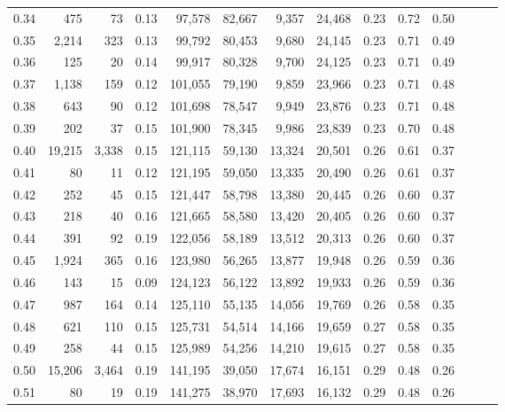 \begin{tabular}{rrrrrrrrrrrrrr}
0.34 &     475 &     73 &  0.13 &   97,578 &   82,667 &   9,357 &  24,468 &  0.23 &  0.72 &      0.50 \\
0.35 &   2,214 &    323 &  0.13 &   99,792 &   80,453 &   9,680 &  24,145 &  0.23 &  0.71 &      0.49 \\
0.36 &     125 &     20 &  0.14 &   99,917 &   80,328 &   9,700 &  24,125 &  0.23 &  0.71 &      0.49 \\
0.37 &   1,138 &    159 &  0.12 &  101,055 &   79,190 &   9,859 &  23,966 &  0.23 &  0.71 &      0.48 \\
0.38 &     643 &     90 &  0.12 &  101,698 &   78,547 &   9,949 &  23,876 &  0.23 &  0.71 &      0.48 \\
0.39 &     202 &     37 &  0.15 &  101,900 &   78,345 &   9,986 &  23,839 &  0.23 &  0.70 &      0.48 \\
0.40 &  19,215 &  3,338 &  0.15 &  121,115 &   59,130 &  13,324 &  20,501 &  0.26 &  0.61 &      0.37 \\
0.41 &      80 &     11 &  0.12 &  121,195 &   59,050 &  13,335 &  20,490 &  0.26 &  0.61 &      0.37 \\
0.42 &     252 &     45 &  0.15 &  121,447 &   58,798 &  13,380 &  20,445 &  0.26 &  0.60 &      0.37 \\
0.43 &     218 &     40 &  0.16 &  121,665 &   58,580 &  13,420 &  20,405 &  0.26 &  0.60 &      0.37 \\
0.44 &     391 &     92 &  0.19 &  122,056 &   58,189 &  13,512 &  20,313 &  0.26 &  0.60 &      0.37 \\
0.45 &   1,924 &    365 &  0.16 &  123,980 &   56,265 &  13,877 &  19,948 &  0.26 &  0.59 &      0.36 \\
0.46 &     143 &     15 &  0.09 &  124,123 &   56,122 &  13,892 &  19,933 &  0.26 &  0.59 &      0.36 \\
0.47 &     987 &    164 &  0.14 &  125,110 &   55,135 &  14,056 &  19,769 &  0.26 &  0.58 &      0.35 \\
0.48 &     621 &    110 &  0.15 &  125,731 &   54,514 &  14,166 &  19,659 &  0.27 &  0.58 &      0.35 \\
0.49 &     258 &     44 &  0.15 &  125,989 &   54,256 &  14,210 &  19,615 &  0.27 &  0.58 &      0.35 \\
0.50 &  15,206 &  3,464 &  0.19 &  141,195 &   39,050 &  17,674 &  16,151 &  0.29 &  0.48 &      0.26 \\
0.51 &      80 &     19 &  0.19 &  141,275 &   38,970 &  17,693 &  16,132 &  0.29 &  0.48 &      0.26 \\

\end{tabular}
